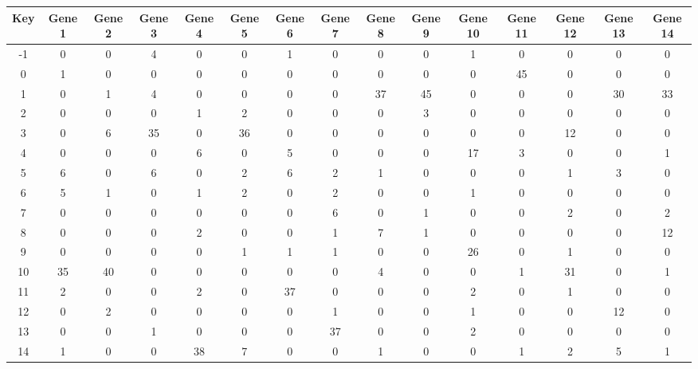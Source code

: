 \begin{tabular}{|c|c|c|c|c|c|c|c|c|c|c|c|c|c|c|}
\hline
Key & Gene 1 & Gene 2 & Gene 3 & Gene 4 & Gene 5 & Gene 6 & Gene 7 & Gene 8 & Gene 9 & Gene 10 & Gene 11 & Gene 12 & Gene 13 & Gene 14 \\
\hline
-1 & 0 & 0 & 4 & 0 & 0 & 1 & 0 & 0 & 0 & 1 & 0 & 0 & 0 & 0 \\
0 & 1 & 0 & 0 & 0 & 0 & 0 & 0 & 0 & 0 & 0 & 45 & 0 & 0 & 0 \\
1 & 0 & 1 & 4 & 0 & 0 & 0 & 0 & 37 & 45 & 0 & 0 & 0 & 30 & 33 \\
2 & 0 & 0 & 0 & 1 & 2 & 0 & 0 & 0 & 3 & 0 & 0 & 0 & 0 & 0 \\
3 & 0 & 6 & 35 & 0 & 36 & 0 & 0 & 0 & 0 & 0 & 0 & 12 & 0 & 0 \\
4 & 0 & 0 & 0 & 6 & 0 & 5 & 0 & 0 & 0 & 17 & 3 & 0 & 0 & 1 \\
5 & 6 & 0 & 6 & 0 & 2 & 6 & 2 & 1 & 0 & 0 & 0 & 1 & 3 & 0 \\
6 & 5 & 1 & 0 & 1 & 2 & 0 & 2 & 0 & 0 & 1 & 0 & 0 & 0 & 0 \\
7 & 0 & 0 & 0 & 0 & 0 & 0 & 6 & 0 & 1 & 0 & 0 & 2 & 0 & 2 \\
8 & 0 & 0 & 0 & 2 & 0 & 0 & 1 & 7 & 1 & 0 & 0 & 0 & 0 & 12 \\
9 & 0 & 0 & 0 & 0 & 1 & 1 & 1 & 0 & 0 & 26 & 0 & 1 & 0 & 0 \\
10 & 35 & 40 & 0 & 0 & 0 & 0 & 0 & 4 & 0 & 0 & 1 & 31 & 0 & 1 \\
11 & 2 & 0 & 0 & 2 & 0 & 37 & 0 & 0 & 0 & 2 & 0 & 1 & 0 & 0 \\
12 & 0 & 2 & 0 & 0 & 0 & 0 & 1 & 0 & 0 & 1 & 0 & 0 & 12 & 0 \\
13 & 0 & 0 & 1 & 0 & 0 & 0 & 37 & 0 & 0 & 2 & 0 & 0 & 0 & 0 \\
14 & 1 & 0 & 0 & 38 & 7 & 0 & 0 & 1 & 0 & 0 & 1 & 2 & 5 & 1 \\
\hline
\end{tabular}